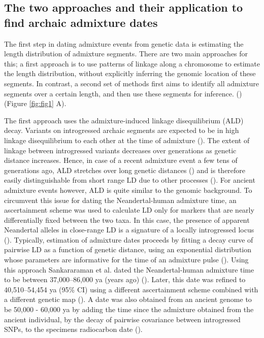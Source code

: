 \documentclass[]{article}
\begin{document}
\subsection{The two approaches and their application to find archaic admixture dates}\label{the-two-approaches-and-their-application-to-find-archaic-admixture-dates}

The first step in dating admixture events from genetic data is estimating the length distribution of admixture segments.  There are two main approaches for this; a first approach is to use patterns of linkage along a chromosome to estimate the length distribution, without explicitly inferring the genomic location of these segments. In contrast, a second set of methods first aims to identify all admixture segments over a certain length, and then use these segments for inference. 
(\cite{chimusa_dating_2018}) (Figure \ref{fig:fig1} A).

The first approach uses the admixture-induced linkage disequilibrium
(ALD) decay. Variants on introgressed archaic segments are
expected to be in high linkage disequilibrium to each other at the time
of admixture
(\cite{chakraborty_admixture_1988,stephens_mapping_1994,wall_detecting_2000}). The extent of linkage between introgressed variants decreases over generations as genetic distance increases. Hence, in case of a recent
admixture event a few tens of generations ago, ALD stretches  over long genetic distances
(\cite{patterson_methods_2004}) and is therefore easily distinguishable
from short range LD due to other processes (\cite{moorjani_history_2011}). For ancient
admixture events however, ALD is quite similar to the genomic background. To circumvent this issue for dating the Neandertal-human admixture time, an ascertainment scheme was used to calculate LD only for markers that are nearly differentially fixed between the two taxa. In this case, the presence of apparent Neandertal alleles in close-range LD is a signature of a locally introgressed locus
(\cite{sankararaman_date_2012}). Typically, estimation of admixture dates proceeds by fitting a decay curve of pairwise LD as a function of
genetic distance, using an exponential distribution whose parameters are informative for the time of an admixture pulse
(\cite{moorjani_history_2011,loh_inferring_2013}). Using this approach Sankararaman et al. dated the Neandertal-human admixture time to
be  between 37,000--86,000 ya (years ago) (\cite{sankararaman_date_2012}). Later,
this date was refined to 40,510--54,454 ya (95\% CI) using a different
ascertainment scheme combined with a different genetic map
(\cite{moorjani_genetic_2016}). A date was also obtained from an ancient
genome to be 50,000 - 60,000 ya by adding the time since the admixture obtained from the
ancient individual, by the decay of pairwise covariance between
introgressed SNPs, to the specimens radiocarbon date
(\cite{fu_genome_2014}).
\end{document}
